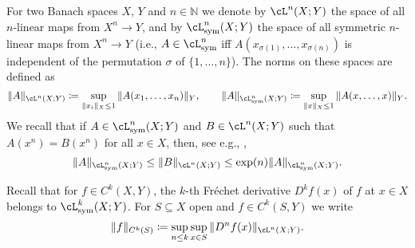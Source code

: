 \medskip

  For two Banach spaces $X$, $Y$ %
  and $n\in\mathbb{N}$ we denote by
  $\cL^n(X;Y)$
  the space of all $n$-linear maps from $X^n\to Y$, and by
    $\cL^n_{\sym}(X;Y)$ the space of all symmetric $n$-linear maps
    from $X^n\to Y$ (i.e., $A\in\cL^n_{\sym}$ iff
    $A(x_{\sigma(1)},\dots,x_{\sigma(n)})$ is independent of the
    permutation $\sigma$ of $\{1,\dots,n\}$). The norms
  on these spaces are defined as
  \begin{equation*}
    \|A\|_{\cL^n(X;Y)} \coloneqq \sup_{\|x_i\|_X\le 1} \|A(x_1,\dots,x_n)\|_Y,\qquad
    \|A\|_{\cL^n_{\sym}(X;Y)} \coloneqq \sup_{\|x\|_X\le 1} \|A(x,\dots,x)\|_Y.
  \end{equation*}
  We recall that if $A\in\cL^n_{\sym}(X;Y)$ and $B\in\cL^n(X;Y)$
    such that $A(x^n)=B(x^n)$ for all $x\in X$, then, see e.g.,
    \cite[14.13]{chae}, 
  \begin{equation}\label{eq:symnorm}
    \|A\|_{\cL^n_{\sym}(X;Y)}
    \le \|B\|_{\cL^n(X;Y)}\le\exp(n)\|A\|_{\cL^n_{\sym}(X;Y)}.
  \end{equation}

  Recall that for $f\in C^k(X,Y)$, the $k$-th Fr\'echet derivative
  $D^kf(x)$ of $f$ at $x\in X$ belongs to $\cL^k_{\sym} (X;Y)$. For
  $S\subseteq X$ open and $f\in C^k(S,Y)$ we write
  \begin{equation}\label{eq:Ck}
    \|f\|_{C^k(S)} \coloneqq \sup_{n\le k}\sup_{x\in S}\|D^n f(x)\|_{\cL^n(X;Y)}.
  \end{equation}

%

